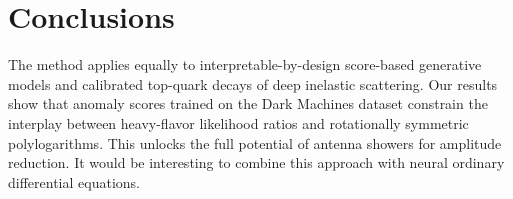 \section{Conclusions}\label{sec:conclusions}

The method applies equally to interpretable-by-design score-based
generative models and calibrated top-quark decays of deep inelastic
scattering. Our results show that anomaly scores trained on the Dark
Machines dataset constrain the interplay between heavy-flavor likelihood
ratios and rotationally symmetric polylogarithms. This unlocks the full
potential of antenna showers for amplitude reduction. It would be
interesting to combine this approach with neural ordinary differential
equations.

